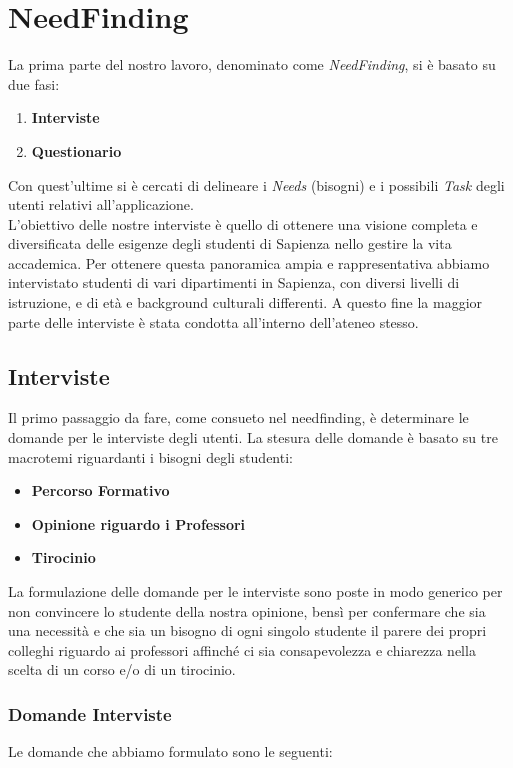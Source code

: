 \chapter{NeedFinding}

La prima parte del nostro lavoro, denominato come \textit{NeedFinding},
si è basato su due fasi:
\begin{enumerate}
    \item \textbf{Interviste}
    \item \textbf{Questionario}
\end{enumerate}
Con quest'ultime si è cercati di delineare i \textit{Needs} (bisogni)
e i possibili \textit{Task} degli utenti relativi all'applicazione.\\

L'obiettivo delle nostre interviste è quello di ottenere una visione completa e diversificata delle esigenze degli studenti di Sapienza nello gestire la vita accademica.
Per ottenere questa panoramica ampia e rappresentativa abbiamo intervistato studenti di vari dipartimenti in Sapienza, con diversi livelli di istruzione, e di età e background culturali differenti.
A questo fine la maggior parte delle interviste è stata condotta all'interno dell'ateneo stesso.

\section{Interviste}
Il primo passaggio da fare, come consueto nel needfinding, è 
determinare le domande per le interviste degli utenti. 
La stesura delle domande è basato su tre macrotemi riguardanti 
i bisogni degli studenti:
\begin{itemize}
    \item \textbf{Percorso Formativo}
    \item \textbf{Opinione riguardo i Professori}
    \item \textbf{Tirocinio}
\end{itemize}
La formulazione delle domande per le interviste sono poste in modo generico
per non convincere lo studente della nostra opinione, bensì per confermare 
che sia una necessità e che sia un bisogno di ogni singolo studente il parere dei 
propri colleghi riguardo ai professori affinché ci sia consapevolezza e chiarezza
nella scelta di un corso e/o di un tirocinio.


\subsection{Domande Interviste}
Le domande che abbiamo formulato sono le seguenti:
